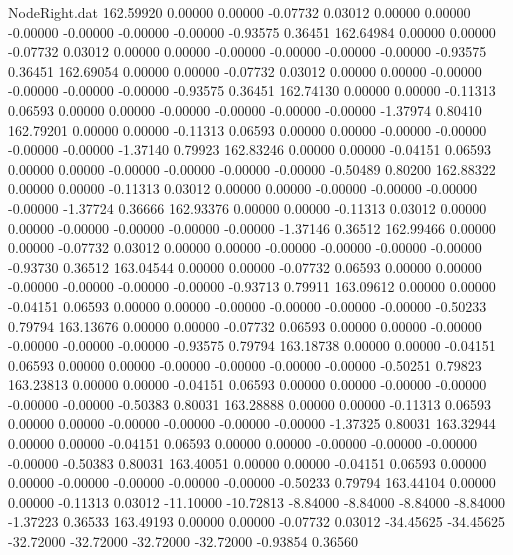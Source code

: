 \begin{filecontents}{NodeRight.dat}
 162.59920    0.00000    0.00000    -0.07732    0.03012    0.00000    0.00000   -0.00000   -0.00000   -0.00000   -0.00000   -0.93575    0.36451
 162.64984    0.00000    0.00000    -0.07732    0.03012    0.00000    0.00000   -0.00000   -0.00000   -0.00000   -0.00000   -0.93575    0.36451
 162.69054    0.00000    0.00000    -0.07732    0.03012    0.00000    0.00000   -0.00000   -0.00000   -0.00000   -0.00000   -0.93575    0.36451
 162.74130    0.00000    0.00000    -0.11313    0.06593    0.00000    0.00000   -0.00000   -0.00000   -0.00000   -0.00000   -1.37974    0.80410
 162.79201    0.00000    0.00000    -0.11313    0.06593    0.00000    0.00000   -0.00000   -0.00000   -0.00000   -0.00000   -1.37140    0.79923
 162.83246    0.00000    0.00000    -0.04151    0.06593    0.00000    0.00000   -0.00000   -0.00000   -0.00000   -0.00000   -0.50489    0.80200
 162.88322    0.00000    0.00000    -0.11313    0.03012    0.00000    0.00000   -0.00000   -0.00000   -0.00000   -0.00000   -1.37724    0.36666
 162.93376    0.00000    0.00000    -0.11313    0.03012    0.00000    0.00000   -0.00000   -0.00000   -0.00000   -0.00000   -1.37146    0.36512
 162.99466    0.00000    0.00000    -0.07732    0.03012    0.00000    0.00000   -0.00000   -0.00000   -0.00000   -0.00000   -0.93730    0.36512
 163.04544    0.00000    0.00000    -0.07732    0.06593    0.00000    0.00000   -0.00000   -0.00000   -0.00000   -0.00000   -0.93713    0.79911
 163.09612    0.00000    0.00000    -0.04151    0.06593    0.00000    0.00000   -0.00000   -0.00000   -0.00000   -0.00000   -0.50233    0.79794
 163.13676    0.00000    0.00000    -0.07732    0.06593    0.00000    0.00000   -0.00000   -0.00000   -0.00000   -0.00000   -0.93575    0.79794
 163.18738    0.00000    0.00000    -0.04151    0.06593    0.00000    0.00000   -0.00000   -0.00000   -0.00000   -0.00000   -0.50251    0.79823
 163.23813    0.00000    0.00000    -0.04151    0.06593    0.00000    0.00000   -0.00000   -0.00000   -0.00000   -0.00000   -0.50383    0.80031
 163.28888    0.00000    0.00000    -0.11313    0.06593    0.00000    0.00000   -0.00000   -0.00000   -0.00000   -0.00000   -1.37325    0.80031
 163.32944    0.00000    0.00000    -0.04151    0.06593    0.00000    0.00000   -0.00000   -0.00000   -0.00000   -0.00000   -0.50383    0.80031
 163.40051    0.00000    0.00000    -0.04151    0.06593    0.00000    0.00000   -0.00000   -0.00000   -0.00000   -0.00000   -0.50233    0.79794
 163.44104    0.00000    0.00000    -0.11313    0.03012  -11.10000  -10.72813   -8.84000   -8.84000   -8.84000   -8.84000   -1.37223    0.36533
 163.49193    0.00000    0.00000    -0.07732    0.03012  -34.45625  -34.45625  -32.72000  -32.72000  -32.72000  -32.72000   -0.93854    0.36560

\end{filecontents}
